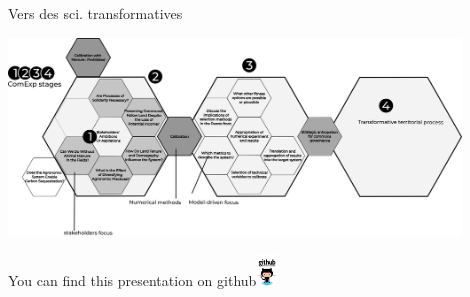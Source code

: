 \documentclass[newPxFont]{beamer}
\begin{document}
\begin{frame}[c]{Vers des sci. transformatives}
  \vspace{-1cm}
  \begin{center}
    \includegraphics[width=12cm]{img/figure_discussion}
   \end{center}
\end{frame}

{
%
\begin{frame}
  \vspace{-1em}
  \begin{minipage}[t][.8\textheight]{\textwidth}

    \vfill

  \end{minipage}
  \vspace{-3.5em}
  \centering
	You can find this presentation on github\includegraphics[height=0.85cm]{img/github}

\end{frame}
}
\end{document}
